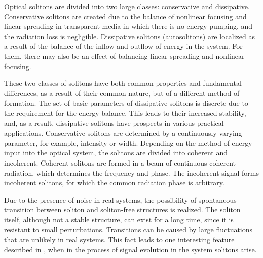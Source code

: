 Optical solitons are divided into two large classes: conservative and dissipative. Conservative solitons are created due to the balance of nonlinear focusing and linear spreading in transparent media in which there is no energy pumping, and the radiation loss is negligible. Dissipative solitons (autosolitons) are localized as a result of the balance of the inflow and outflow of energy in the system. For them, there may also be an effect of balancing linear spreading and nonlinear focusing.


These two classes of solitons have both common properties and fundamental differences, as a result of their common nature, but of a different method of formation. The set of basic parameters of dissipative solitons is discrete due to the requirement for the energy balance. This leads to their increased stability, and, as a result, dissipative solitons have prospects in various practical applications. Conservative solitons are determined by a continuously varying parameter, for example, intensity or width. Depending on the method of energy input into the optical system, the solitons are divided into coherent and incoherent. Coherent solitons are formed in a beam of continuous coherent radiation, which determines the frequency and phase. The incoherent signal forms incoherent solitons, for which the common radiation phase is arbitrary.

Due to the presence of noise in real systems, the possibility of spontaneous transition between soliton and soliton-free structures is realized. The soliton itself, although not a stable structure, can exist for a long time, since it is resistant to small perturbations. Transitions can be caused by large fluctuations that are unlikely in real systems. This fact leads to one interesting feature described in \cite{PS01}, when in the process of signal evolution in the system solitons arise.

